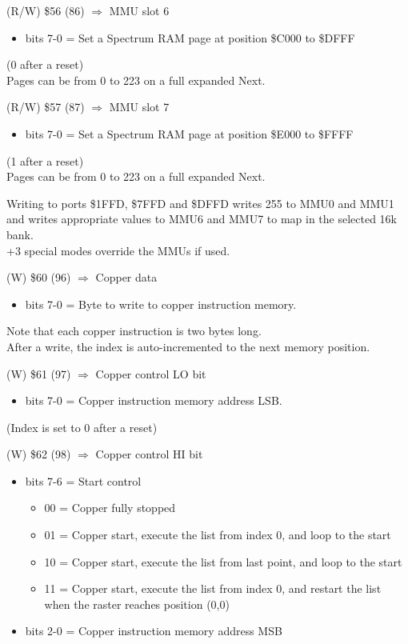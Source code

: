 (R/W) \$56 (86) $\Rightarrow$ MMU slot 6
\begin{itemize}
\item[] bits 7-0 = Set a Spectrum RAM page at position \$C000 to \$DFFF
\end{itemize}
(0 after a reset)\\
Pages can be from 0 to 223 on a full expanded Next.

(R/W) \$57 (87) $\Rightarrow$ MMU slot 7
\begin{itemize}
\item[] bits 7-0 = Set a Spectrum RAM page at position \$E000 to \$FFFF
\end{itemize}
(1 after a reset)\\
Pages can be from 0 to 223 on a full expanded Next.

Writing to ports \$1FFD, \$7FFD and \$DFFD writes 255 to MMU0 and MMU1
and writes appropriate values to MMU6 and MMU7 to map in the selected
16k bank.\\
+3 special modes override the MMUs if used.

(W) \$60 (96) $\Rightarrow$ Copper data
\begin{itemize}
\item[] bits 7-0 = Byte to write to copper instruction memory.
\end{itemize}
Note that each copper instruction is two bytes long.\\
After a write, the index is auto-incremented to the next memory position.

(W) \$61 (97) $\Rightarrow$ Copper control LO bit
\begin{itemize}
\item[] bits 7-0 = Copper instruction memory address LSB.
\end{itemize}
(Index is set to 0 after a reset)

(W) \$62 (98) $\Rightarrow$ Copper control HI bit
\begin{itemize}
\item[] bits 7-6 = Start control
  \begin{itemize}
  \item[] 00 = Copper fully stopped
  \item[] 01 = Copper start, execute the list from index 0, and loop
    to the start
  \item[] 10 = Copper start, execute the list from last point, and
    loop to the start
  \item[] 11 = Copper start, execute the list from index 0, and
    restart the list when the raster reaches position (0,0)
  \end{itemize}
\item[] bits 2-0 = Copper instruction memory address MSB
\end{itemize}

